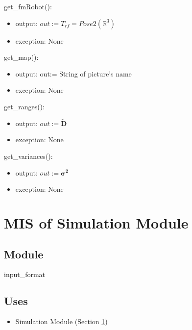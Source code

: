 \documentclass[12pt, titlepage]{article}
\begin{document}
\noindent get\_fmRobot():
\begin{itemize}
    \item output: $out:= T_{rf}=Pose2(\mathbb{R}^{3})$
    \item exception: None
\end{itemize}

\noindent get\_map():
\begin{itemize}
    \item output: out:=  String of picture's name  
    \item exception: None
\end{itemize}

\noindent get\_ranges():
\begin{itemize}
    \item output: $out:=\mathbf{\tilde{D}}$
    \item exception: None
\end{itemize}

\noindent get\_variances():
\begin{itemize}
    \item output: $out:=\boldsymbol{\sigma^2}$
    \item exception: None
\end{itemize}


\newpage

\section{MIS of Simulation Module} \label{M_Simulate} 




\subsection{Module}

input\_format

\subsection{Uses}
\begin{itemize}
  \item Simulation Module (Section \ref{M_Simulate})
\end{itemize}
\end{document}
